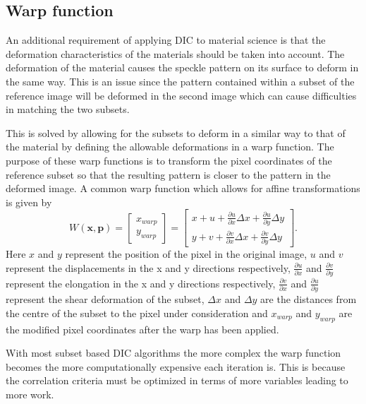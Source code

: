 
\subsection{Warp function}
An additional requirement of applying DIC to material science is that the deformation characteristics of the materials should be taken into account. The deformation of the material causes the speckle pattern on its surface to deform in the same way. This is an issue since the pattern contained within a subset of the reference image will be deformed in the second image which can cause difficulties in matching the two subsets.

This is solved by allowing for the subsets to deform in a similar way to that of the material by defining the allowable deformations in a warp function. The purpose of these warp functions is to transform the pixel coordinates of the reference subset so that the resulting pattern is closer to the pattern in the deformed image. A common warp function which allows for affine transformations is given by
\begin{equation}
	W (\bm{x},\bm{p}) = 
	\begin{bmatrix}
	x_{warp} \\
	y_{warp}
	\end{bmatrix} 
	= \begin{bmatrix}
	x + u + \frac{\partial u}{\partial x} \Delta x + \frac{\partial u}{\partial y} \Delta y \\
	y + v + \frac{\partial v}{\partial x} \Delta x + \frac{\partial v}{\partial y} \Delta y
	\end{bmatrix}.
	\label{eq:warp}
\end{equation}
Here $x$ and $y$ represent the position of the pixel in the original image, $u$ and $v$ represent the displacements in the x and y directions respectively, $\frac{\partial u}{\partial x}$ and $\frac{\partial v}{\partial y}$ represent the elongation in the x and y directions respectively, $\frac{\partial v}{\partial x}$ and $\frac{\partial u}{\partial y}$ represent the shear deformation of the subset, $\Delta x$ and $\Delta y$ are the distances from the centre of the subset to the pixel under consideration and $x_{warp}$ and $y_{warp}$ are the modified pixel coordinates after the warp has been applied.

With most subset based DIC algorithms the more complex the warp function becomes the more computationally expensive each iteration is. This is because the correlation criteria must be optimized in terms of more variables leading to more work.

